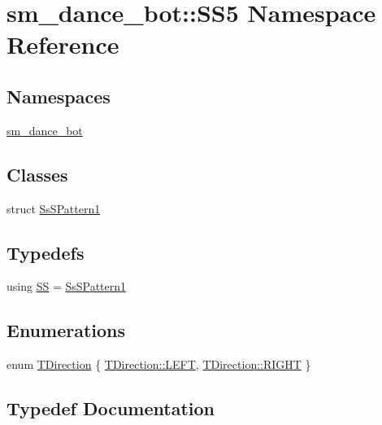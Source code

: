 \hypertarget{namespacesm__dance__bot_1_1SS5}{}\section{sm\+\_\+dance\+\_\+bot\+:\+:S\+S5 Namespace Reference}
\label{namespacesm__dance__bot_1_1SS5}
\subsection*{Namespaces}
\begin{DoxyCompactItemize}
\item 
 \hyperlink{namespacesm__dance__bot_1_1SS5_1_1sm__dance__bot}{sm\+\_\+dance\+\_\+bot}
\end{DoxyCompactItemize}
\subsection*{Classes}
\begin{DoxyCompactItemize}
\item 
struct \hyperlink{structsm__dance__bot_1_1SS5_1_1SsSPattern1}{Ss\+S\+Pattern1}
\end{DoxyCompactItemize}
\subsection*{Typedefs}
\begin{DoxyCompactItemize}
\item 
using \hyperlink{namespacesm__dance__bot_1_1SS5_a0205d7a46d2171e30393c1723859e277}{SS} = \hyperlink{structsm__dance__bot_1_1SS5_1_1SsSPattern1}{Ss\+S\+Pattern1}
\end{DoxyCompactItemize}
\subsection*{Enumerations}
\begin{DoxyCompactItemize}
\item 
enum \hyperlink{namespacesm__dance__bot_1_1SS5_aaa01c87b9245bbff2b581cefd6f3b346}{T\+Direction} \{ \hyperlink{namespacesm__dance__bot_1_1SS5_aaa01c87b9245bbff2b581cefd6f3b346a684d325a7303f52e64011467ff5c5758}{T\+Direction\+::\+L\+E\+FT}, 
\hyperlink{namespacesm__dance__bot_1_1SS5_aaa01c87b9245bbff2b581cefd6f3b346a21507b40c80068eda19865706fdc2403}{T\+Direction\+::\+R\+I\+G\+HT}
 \}
\end{DoxyCompactItemize}


\subsection{Typedef Documentation}
